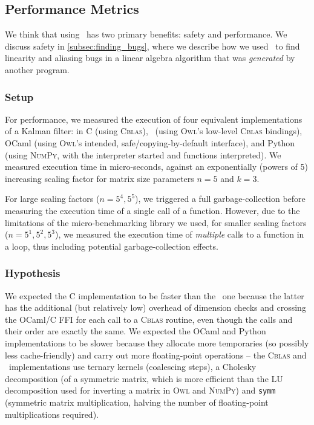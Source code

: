 \subsection{Performance Metrics}

We think that using \lang\ has two primary benefits: safety and performance. We
discuss safety in \ref{subsec:finding_bugs}, where we describe how we used
\lang\ to find linearity and aliasing bugs in a linear algebra algorithm that
was \emph{generated} by another program.

\subsubsection{Setup}

For performance, we measured the execution of four equivalent
implementations of a Kalman filter: in C (using \textsc{Cblas}), \lang\ (using
\textsc{Owl}'s low-level \textsc{Cblas} bindings), OCaml (using \textsc{Owl}'s
intended, safe/copying-by-default interface), and Python (using \textsc{NumPy},
with the interpreter started and functions interpreted). We measured execution
time in micro-seconds, against an exponentially (powers of 5) increasing
scaling factor for matrix size parameters $n=5$ and $k=3$.

For large scaling factors ($n = 5^4, 5^5$), we triggered a full
garbage-collection before measuring the execution time of a single call of a
function. However, due to the limitations of the micro-benchmarking library we
used, for smaller scaling factors ($n = 5^1, 5^2, 5^3$), we measured the
execution time of \emph{multiple} calls to a function in a loop, thus including
potential garbage-collection effects.

\subsubsection{Hypothesis}

We expected the C implementation to be faster than the \lang\ one because the
latter has the additional (but relatively low) overhead of dimension checks and
crossing the OCaml/C FFI for each call to a \textsc{Cblas} routine, even though
the calls and their order are exactly the same. We expected the OCaml and
Python implementations to be slower because they allocate more temporaries (so
possibly less cache-friendly) and carry out more floating-point operations --
the \textsc{Cblas} and \lang\ implementations use ternary kernels (coalescing
steps), a Cholesky decomposition (of a symmetric matrix, which is more
efficient than the LU decomposition used for inverting a matrix in \textsc{Owl}
and \textsc{NumPy}) and \texttt{symm} (symmetric matrix multiplication, halving
the number of floating-point multiplications required).

